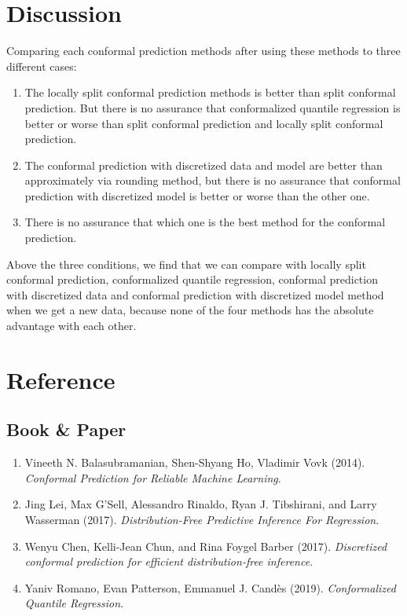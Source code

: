 \documentclass[11pt,a4paper]{article}
\begin{document}
\section{Discussion}
Comparing each conformal prediction methods after using these methods to three different cases:
\begin{enumerate}
    \item The locally split conformal prediction methods is better than split conformal prediction. But there is no assurance that conformalized quantile regression is better or worse than split conformal prediction and locally split conformal prediction.
    \item The conformal prediction with discretized data and model are better than approximately via rounding method, but there is no assurance that conformal prediction with discretized model is better or worse than the other one.
    \item There is no assurance that which one is the best method for the conformal prediction.
\end{enumerate}

Above the three conditions, we find that we can compare with locally split conformal prediction, conformalized quantile regression, conformal prediction with discretized data and conformal prediction with discretized model method when we get a new data, because none of the four methods has the absolute advantage with each other.

\section{Reference}
\subsection{Book \& Paper}
\begin{enumerate}
    \item Vineeth N. Balasubramanian, Shen-Shyang Ho, Vladimir Vovk (2014). \textit{Conformal Prediction for Reliable Machine Learning}.
    \item Jing Lei, Max G'Sell, Alessandro Rinaldo, Ryan J. Tibshirani, and Larry Wasserman (2017). \textit{Distribution-Free Predictive Inference For Regression}.
    \item Wenyu Chen, Kelli-Jean Chun, and Rina Foygel Barber (2017). \textit{Discretized conformal prediction for efficient distribution-free inference}.
    \item Yaniv Romano, Evan Patterson, Emmanuel J. Candès (2019). \textit{Conformalized Quantile Regression}.
\end{enumerate}
\end{document}
